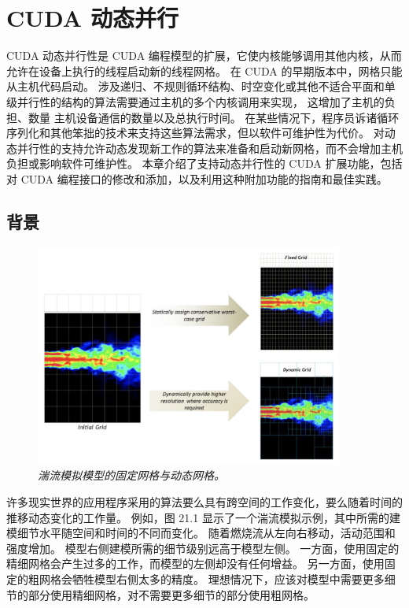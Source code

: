 \section{CUDA 动态并行}
CUDA 动态并行性是 CUDA 编程模型的扩展，它使内核能够调用其他内核，从而允许在设备上执行的线程启动新的线程网格。 
在 CUDA 的早期版本中，网格只能从主机代码启动。 
涉及递归、不规则循环结构、时空变化或其他不适合平面和单级并行性的结构的算法需要通过主机的多个内核调用来实现，
这增加了主机的负担、数量 主机设备通信的数量以及总执行时间。 
在某些情况下，程序员诉诸循环序列化和其他笨拙的技术来支持这些算法需求，但以软件可维护性为代价。 
对动态并行性的支持允许动态发现新工作的算法来准备和启动新网格，而不会增加主机负担或影响软件可维护性。 
本章介绍了支持动态并行性的 CUDA 扩展功能，包括对 CUDA 编程接口的修改和添加，以及利用这种附加功能的指南和最佳实践。

\subsection{背景}
\begin{figure}[H]
	\centering
	\includegraphics[width=0.9\textwidth]{figs/F21.1.png}
	\caption{\textit{湍流模拟模型的固定网格与动态网格。}}
\end{figure}

许多现实世界的应用程序采用的算法要么具有跨空间的工作变化，要么随着时间的推移动态变化的工作量。 
例如，图 21.1 显示了一个湍流模拟示例，其中所需的建模细节水平随空间和时间的不同而变化。 
随着燃烧流从左向右移动，活动范围和强度增加。 模型右侧建模所需的细节级别远高于模型左侧。 
一方面，使用固定的精细网格会产生过多的工作，而模型的左侧却没有任何增益。 
另一方面，使用固定的粗网格会牺牲模型右侧太多的精度。 
理想情况下，应该对模型中需要更多细节的部分使用精细网格，对不需要更多细节的部分使用粗网格。

